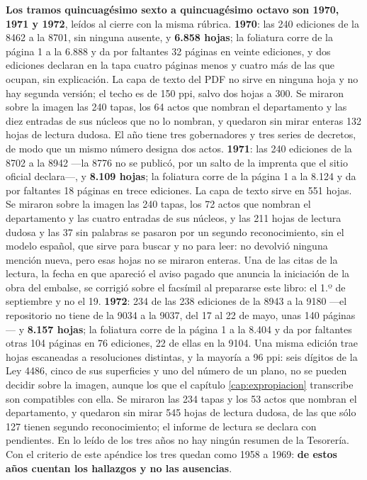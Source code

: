 \textbf{Los tramos quincuagésimo sexto a quincuagésimo octavo son 1970, 1971 y 1972}, leídos al cierre con la misma rúbrica. \textbf{1970}: las 240 ediciones de la 8462 a la 8701, sin ninguna ausente, y \textbf{6.858 hojas}; la foliatura corre de la página 1 a la 6.888 y da por faltantes 32 páginas en veinte ediciones, y dos ediciones declaran en la tapa cuatro páginas menos y cuatro más de las que ocupan, sin explicación. La capa de texto del PDF no sirve en ninguna hoja y no hay segunda versión; el techo es de 150 ppi, salvo dos hojas a 300. Se miraron sobre la imagen las 240 tapas, los 64 actos que nombran el departamento y las diez entradas de sus núcleos que no lo nombran, y quedaron sin mirar enteras 132 hojas de lectura dudosa. El año tiene tres gobernadores y tres series de decretos, de modo que un mismo número designa dos actos. \textbf{1971}: las 240 ediciones de la 8702 a la 8942 ---la 8776 no se publicó, por un salto de la imprenta que el sitio oficial declara---, y \textbf{8.109 hojas}; la foliatura corre de la página 1 a la 8.124 y da por faltantes 18 páginas en trece ediciones. La capa de texto sirve en 551 hojas. Se miraron sobre la imagen las 240 tapas, los 72 actos que nombran el departamento y las cuatro entradas de sus núcleos, y las 211 hojas de lectura dudosa y las 37 sin palabras se pasaron por un segundo reconocimiento, sin el modelo español, que sirve para buscar y no para leer: no devolvió ninguna mención nueva, pero esas hojas no se miraron enteras. Una de las citas de la lectura, la fecha en que apareció el aviso pagado que anuncia la iniciación de la obra del embalse, se corrigió sobre el facsímil al prepararse este libro: el 1.º de septiembre y no el 19. \textbf{1972}: 234 de las 238 ediciones de la 8943 a la 9180 ---el repositorio no tiene de la 9034 a la 9037, del 17 al 22 de mayo, unas 140 páginas--- y \textbf{8.157 hojas}; la foliatura corre de la página 1 a la 8.404 y da por faltantes otras 104 páginas en 76 ediciones, 22 de ellas en la 9104. Una misma edición trae hojas escaneadas a resoluciones distintas, y la mayoría a 96 ppi: seis dígitos de la Ley 4486, cinco de sus superficies y uno del número de un plano, no se pueden decidir sobre la imagen, aunque los que el capítulo \ref{cap:expropiacion} transcribe son compatibles con ella. Se miraron las 234 tapas y los 53 actos que nombran el departamento, y quedaron sin mirar 545 hojas de lectura dudosa, de las que sólo 127 tienen segundo reconocimiento; el informe de lectura se declara con pendientes. En lo leído de los tres años no hay ningún resumen de la Tesorería. Con el criterio de este apéndice los tres quedan como 1958 a 1969: \textbf{de estos años cuentan los hallazgos y no las ausencias}.

